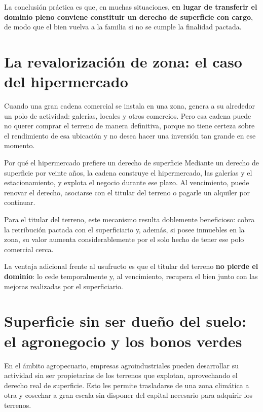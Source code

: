 \documentclass[12pt,oneside]{book}
\begin{document}
La conclusión práctica es que, en muchas situaciones, \textbf{en lugar de transferir el dominio pleno conviene constituir un derecho de superficie con cargo}, de modo que el bien vuelva a la familia si no se cumple la finalidad pactada.

\section{La revalorización de zona: el caso del hipermercado}

Cuando una gran cadena comercial se instala en una zona, genera a su alrededor un polo de actividad: galerías, locales y otros comercios. Pero esa cadena puede no querer comprar el terreno de manera definitiva, porque no tiene certeza sobre el rendimiento de esa ubicación y no desea hacer una inversión tan grande en ese momento.

\begin{example}{Por qué el hipermercado prefiere un derecho de superficie}
Mediante un derecho de superficie por veinte años, la cadena construye el hipermercado, las galerías y el estacionamiento, y explota el negocio durante ese plazo. Al vencimiento, puede renovar el derecho, asociarse con el titular del terreno o pagarle un alquiler por continuar.

Para el titular del terreno, este mecanismo resulta doblemente beneficioso: cobra la retribución pactada con el superficiario y, además, si posee inmuebles en la zona, su valor aumenta considerablemente por el solo hecho de tener ese polo comercial cerca.
\end{example}

La ventaja adicional frente al usufructo es que el titular del terreno \textbf{no pierde el dominio}: lo cede temporalmente y, al vencimiento, recupera el bien junto con las mejoras realizadas por el superficiario.

\section{Superficie sin ser dueño del suelo: el agronegocio y los bonos verdes}

En el ámbito agropecuario, empresas agroindustriales pueden desarrollar su actividad sin ser propietarias de los terrenos que explotan, aprovechando el derecho real de superficie. Esto les permite trasladarse de una zona climática a otra y cosechar a gran escala sin disponer del capital necesario para adquirir los terrenos.
\end{document}
